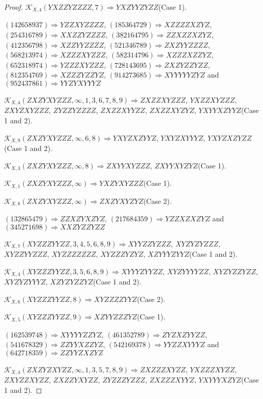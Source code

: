 \documentclass[12pt]{article}
\theoremstyle{plain}
\theoremstyle{definition}
\theoremstyle{remark}
\newcommand{\fancy}[1]{\mathcal{#1}}
\def\K{\fancy{K}}
\begin{document}
\begin{proof}
	$\K_{X,4}(YXZZYZZZZ,7)\Rightarrow $$YXZYYZYZZ$(Case 1).
	
	
	
	$(1 4 2 6 5 8 9 3 7)\Rightarrow YZZXYZZZZ$, $(1 8 5 3 6 4 7 2 9)\Rightarrow XZZZZXZYZ$, $(2 5 4 3 1 6 7 8 9)\Rightarrow XXZZYZZZZ$, $(3 8 2 1 6 4 7 9 5)\Rightarrow ZZXZZXZYZ$, $(4 1 2 3 5 6 7 9 8)\Rightarrow XZZYYZZZZ$, $(5 2 1 3 4 6 7 8 9)\Rightarrow ZXZYYZZZZ$, $(5 6 8 2 1 3 9 7 4)\Rightarrow XZZZXYZZZ$, $(5 8 2 3 1 4 7 9 6)\Rightarrow XZZZXZZYZ$, $(6 5 2 3 1 8 9 7 4)\Rightarrow YZZZXYZZZ$, $(7 2 8 1 4 3 6 9 5)\Rightarrow ZXZYZZYZZ$, $(8 1 2 3 5 4 7 6 9)\Rightarrow XZZZYZZYZ$, $(9 1 4 2 7 3 6 8 5)\Rightarrow XYYYYYZYZ$ and $(9 5 2 4 3 7 8 6 1)\Rightarrow YYZYXYYYZ$
	
	
	$\K_{X,4}(ZXZYXYZZZ,\infty,1, 3, 6, 7, 8, 9)\Rightarrow $$ZXZZXYZZZ$, $YXZZXYZZZ$, $ZXYZXYZZZ$, $ZYZZYZZZZ$, $ZXZZXYYZZ$, $ZXZZXYZYZ$, $YXYYXZYYZ$(Case 1 and 2).
	
	$\K_{X,9}(ZXZYXYZZZ,\infty,6, 8)\Rightarrow $$YXYZXZYYZ$, $YXYZXYYYZ$, $YXYZXZYZZ$(Case 1 and 2).
	
	$\K_{X,3}(ZXZYXYZZZ,\infty,8)\Rightarrow $$ZXYYXYZZZ$, $ZXYYXYZYZ$(Case 1).
	
	$\K_{X,1}(ZXZYXYZZZ,\infty)\Rightarrow $$YXZYXYZZZ$(Case 1).
	
	$\K_{X,8}(ZXZYXYZZZ,\infty)\Rightarrow $$ZXZYXYZYZ$(Case 2).
	
	
	
	$(1 3 2 8 6 5 4 7 9)\Rightarrow ZZXZYXZYZ$, $(2 1 7 6 8 4 3 5 9)\Rightarrow YZZXZXZYZ$ and $(3 4 5 2 7 1 6 9 8)\Rightarrow XXZYZZYZZ$
	
	
	$\K_{X,7}(XYZZZYYZZ,3, 4, 5, 6, 8, 9)\Rightarrow $$XYYZZYZZZ$, $XYZYZYZZZ$, $XYZZYYZZZ$, $XYZZZZZZZ$, $XYZZZYZYZ$, $XZYYYZYYZ$(Case 1 and 2).
	
	$\K_{X,4}(XYZZZYYZZ,3, 5, 6, 8, 9)\Rightarrow $$XYYYZYYZZ$, $XYZYYYYZZ$, $XYZYZZYZZ$, $XYZYZYYYZ$, $XZYZYZZYZ$(Case 1 and 2).
	
	$\K_{X,6}(XYZZZYYZZ,8)\Rightarrow $$XYZZZZYYZ$(Case 2).
	
	$\K_{X,5}(XYZZZYYZZ,9)\Rightarrow $$XZYYZZZYZ$(Case 1).
	
	
	
	$(1 6 2 5 3 9 7 4 8)\Rightarrow XYYYYZZYZ$, $(4 6 1 3 5 2 7 8 9)\Rightarrow ZYZXZYYZZ$, $(5 4 1 6 7 8 3 2 9)\Rightarrow ZZYYXZZYZ$, $(5 4 2 1 6 9 3 7 8)\Rightarrow YYZZXYYYZ$ and $(6 4 2 7 1 8 3 5 9)\Rightarrow ZZYYZXZYZ$
	
	
	$\K_{X,4}(ZXZYZXYZZ,\infty,1, 3, 5, 7, 8, 9)\Rightarrow $$ZXZZZXYZZ$, $YXZZZXYZZ$, $ZXYZZXYZZ$, $ZXZZYXYZZ$, $ZYZZZYZZZ$, $ZXZZZXYYZ$, $YXYYYXZYZ$(Case 1 and 2).
	

\end{proof}
\end{document}
